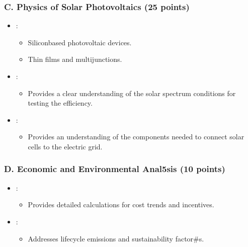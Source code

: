 \documentclass[letterpaper,10pt,english]{jupyterBook}
\begin{document}
\subsubsection{C. Physics of Solar Photovoltaics (25 points)}
\label{\detokenize{ProjectSyllabus:c-physics-of-solar-photovoltaics-25-points}}\begin{itemize}
\item {} 
\sphinxAtStartPar
{}:
\begin{itemize}
\item {} 
\sphinxAtStartPar
Silicon\sphinxhyphen{}based photovoltaic devices.

\item {} 
\sphinxAtStartPar
Thin films and multijunctions.

\end{itemize}

\item {} 
\sphinxAtStartPar
{}:
\begin{itemize}
\item {} 
\sphinxAtStartPar
Provides a clear understanding of the solar spectrum conditions
for testing the efficiency.

\end{itemize}

\item {} 
\sphinxAtStartPar
{}:
\begin{itemize}
\item {} 
\sphinxAtStartPar
Provides an understanding of the components needed to connect
solar cells to the electric grid.

\end{itemize}

\end{itemize}


\subsubsection{D. Economic and Environmental Anal5sis (10 points)}
\label{\detokenize{ProjectSyllabus:d-economic-and-environmental-anal5sis-10-points}}\begin{itemize}
\item {} 
\sphinxAtStartPar
{}:
\begin{itemize}
\item {} 
\sphinxAtStartPar
Provides detailed calculations for cost trends and incentives.

\end{itemize}

\item {} 
\sphinxAtStartPar
{}:
\begin{itemize}
\item {} 
\sphinxAtStartPar
Addresses life\sphinxhyphen{}cycle emissions and sustainability factor\#s.

\end{itemize}

\end{itemize}
\end{document}
